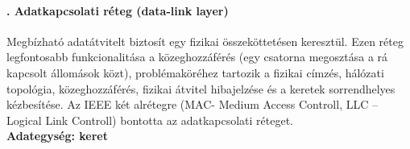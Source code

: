 \paragraph[Adatkapcsolati réteg]{. Adatkapcsolati réteg (data-link layer)}
Megbízható adatátvitelt biztosít egy fizikai összeköttetésen keresztül. Ezen réteg legfontosabb funkcionalitása a közeghozzáférés (egy csatorna megosztása a rá kapcsolt állomások közt), problémaköréhez tartozik a fizikai címzés, hálózati topológia, közeghozzáférés, fizikai átvitel hibajelzése és a keretek sorrendhelyes kézbesítése. Az IEEE két alrétegre (MAC- Medium Access Controll, LLC – Logical Link Controll) bontotta az adatkapcsolati réteget.\\
\textbf{Adategység: keret}
